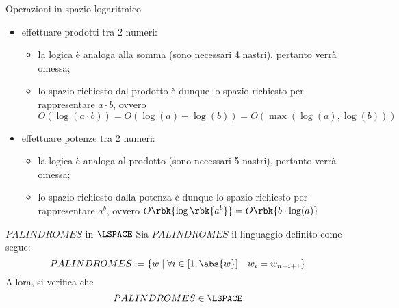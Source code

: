 \documentclass[a4paper, 12pt]{report}
\begin{document}
\begin{framedprop}[label={log space ops}, breakable]{Operazioni in spazio logaritmico}
\begin{itemize}
\begin{itemize}
                \end{itemize}
            \item effettuare prodotti tra 2 numeri:
                \begin{itemize}
                    \item la logica è analoga alla somma (sono necessari 4 nastri), pertanto verrà omessa;
                    \item lo spazio richiesto dal prodotto è dunque lo spazio richiesto per rappresentare $a \cdot b$, ovvero $O(\log(a \cdot b)) = O(\log(a) + \log(b)) = O(\max(\log(a), \log(b)))$
                \end{itemize}
            \item effettuare potenze tra 2 numeri:
                \begin{itemize}
                    \item la logica è analoga al prodotto (sono necessari 5 nastri), pertanto verrà omessa;
                    \item lo spazio richiesto dalla potenza è dunque lo spazio richiesto per rappresentare $a^b$, ovvero $O \rbk{\log \rbk{a^b}} = O \rbk{b \cdot \log(a)}$
                \end{itemize}
        \end{itemize}
    \end{framedprop}

    \begin{framedthm}{$PALINDROMES$ in $\LSPACE$}
        Sia $PALINDROMES$ il linguaggio definito come segue: $$PALINDROMES := \{w \mid \forall i \in [1, \abs{w}] \quad w_i = w_{n - i + 1}\}$$ Allora, si verifica che $$PALINDROMES \in \LSPACE$$
    \end{framedthm}
\end{document}
